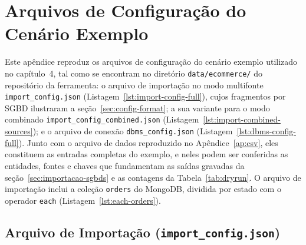 \chapter{Arquivos de Configuração do Cenário Exemplo}
\label{ap:config}

Este apêndice reproduz os arquivos de configuração do cenário exemplo utilizado no
capítulo~4, tal como se encontram no diretório \texttt{data/ecommerce/} do repositório da
ferramenta: o arquivo de importação no modo multifonte \texttt{import\_config.json}
(Listagem~\ref{lst:import-config-full}), cujos fragmentos por SGBD ilustraram a
seção~\ref{sec:config-format}; a sua variante para o modo combinado
\texttt{import\_config\_combined.json} (Listagem~\ref{lst:import-combined-sources}); e o
arquivo de conexão \texttt{dbms\_config.json} (Listagem~\ref{lst:dbms-config-full}). Junto
com o arquivo de dados reproduzido no Apêndice~\ref{ap:csv}, eles constituem as entradas
completas do exemplo, e neles podem ser conferidas as entidades, fontes e chaves que
fundamentam as saídas gravadas da seção~\ref{sec:importacao-sgbds} e as contagens
da Tabela~\ref{tab:dryrun}. O arquivo de importação inclui a coleção \texttt{orders} do
MongoDB, dividida por estado com o operador \texttt{each} (Listagem~\ref{lst:each-orders}).

\section{Arquivo de Importação (\texttt{import\_config.json})}


